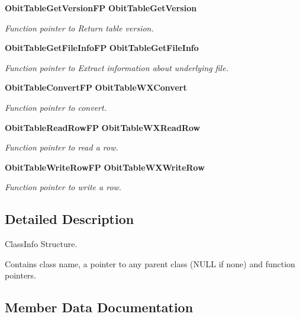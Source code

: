 \begin{CompactItemize}
{\bf Obit\-Table\-Get\-Version\-FP} {\bf Obit\-Table\-Get\-Version}
\begin{CompactList}\small\item\em Function pointer to Return table version. \item\end{CompactList}\item 
{\bf Obit\-Table\-Get\-File\-Info\-FP} {\bf Obit\-Table\-Get\-File\-Info}
\begin{CompactList}\small\item\em Function pointer to Extract information about underlying file. \item\end{CompactList}\item 
{\bf Obit\-Table\-Convert\-FP} {\bf Obit\-Table\-WXConvert}
\begin{CompactList}\small\item\em Function pointer to convert. \item\end{CompactList}\item 
{\bf Obit\-Table\-Read\-Row\-FP} {\bf Obit\-Table\-WXRead\-Row}
\begin{CompactList}\small\item\em Function pointer to read a row. \item\end{CompactList}\item 
{\bf Obit\-Table\-Write\-Row\-FP} {\bf Obit\-Table\-WXWrite\-Row}
\begin{CompactList}\small\item\em Function pointer to write a row. \item\end{CompactList}\end{CompactItemize}


\subsection{Detailed Description}
Class\-Info Structure. 

Contains class name, a pointer to any parent class (NULL if none) and function pointers. 



\subsection{Member Data Documentation}
